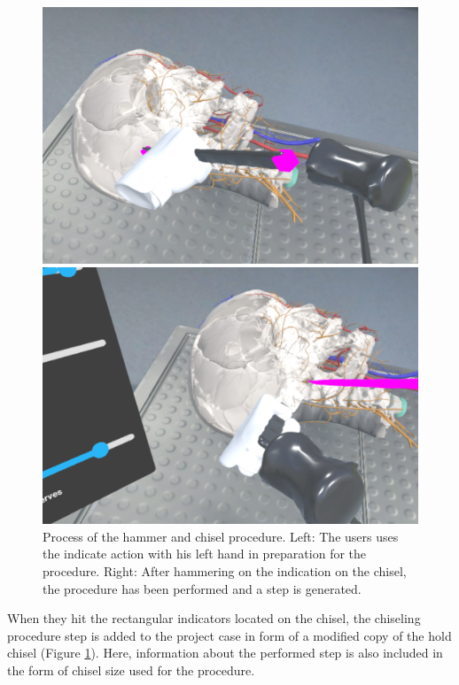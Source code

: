 \begin{figure}[ht]
    \centering
    \begin{minipage}{.5\textwidth}
      \centering
      \includegraphics[width=0.99\linewidth]{images/implementation/features/procedures/chisel_1.png}
    \end{minipage}%
    \begin{minipage}{.5\textwidth}
      \centering
      \includegraphics[width=0.99\linewidth]{images/implementation/features/procedures/chisel_2.png}
    \end{minipage}
    \caption{\label{fig::ChiselProcedure}Process of the hammer and chisel procedure. Left: The users uses the indicate action with his left hand in preparation for the procedure. Right: After hammering on the indication on the chisel, the procedure has been performed and a step is generated.}
\end{figure}

When they hit the rectangular indicators located on the chisel, the chiseling procedure step is added to the project case in form of a modified copy of the hold chisel (Figure \ref{fig::ChiselProcedure}).
Here, information about the performed step is also included in the form of chisel size used for the procedure. 